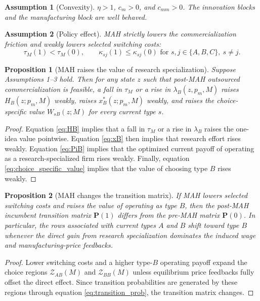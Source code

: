 \documentclass[12pt]{article}
\newtheorem{assumption}{Assumption}
\newtheorem{proposition}{Proposition}
\newcommand{\1}{\mathbf{1}}
\begin{document}
\begin{assumption}[Convexity]
$\eta>1$, $c_m>0$, and $c_{mm}>0$. The innovation blocks and the manufacturing block are well behaved.
\end{assumption}

\begin{assumption}[Policy effect]
MAH strictly lowers the commercialization friction and weakly lowers selected switching costs:
\[
\tau_M(1)<\tau_M(0),
\qquad
\kappa_{sj}(1)\le \kappa_{sj}(0)
\text{ for } s,j\in\{A,B,C\},\ s\neq j.
\]
\end{assumption}

\begin{proposition}[MAH raises the value of research specialization]
Suppose Assumptions 1--3 hold. Then for any state $z$ such that post-MAH outsourced commercialization is feasible, a fall in $\tau_M$ or a rise in $\lambda_B(z,p_m,M)$ raises $H_B(z;p_m,M)$ weakly, raises $x_B^*(z;p_m,M)$ weakly, and raises the choice-specific value $W_{sB}(z;M)$ for every current type $s$.
\end{proposition}

\begin{proof}
Equation \eqref{eq:HB} implies that a fall in $\tau_M$ or a rise in $\lambda_B$ raises the one-idea value pointwise. Equation \eqref{eq:xB} then implies that research effort rises weakly. Equation \eqref{eq:PiB} implies that the optimized current payoff of operating as a research-specialized firm rises weakly. Finally, equation \eqref{eq:choice_specific_value} implies that the value of choosing type $B$ rises weakly.
\end{proof}

\begin{proposition}[MAH changes the transition matrix]
If MAH lowers selected switching costs and raises the value of operating as type $B$, then the post-MAH incumbent transition matrix $\mathbf P(1)$ differs from the pre-MAH matrix $\mathbf P(0)$. In particular, the rows associated with current types $A$ and $B$ shift toward type $B$ whenever the direct gain from research specialization dominates the induced wage and manufacturing-price feedbacks.
\end{proposition}

\begin{proof}
Lower switching costs and a higher type-$B$ operating payoff expand the choice regions $\mathcal Z_{AB}(M)$ and $\mathcal Z_{BB}(M)$ unless equilibrium price feedbacks fully offset the direct effect. Since transition probabilities are generated by these regions through equation \eqref{eq:transition_prob}, the transition matrix changes.
\end{proof}
\end{document}
